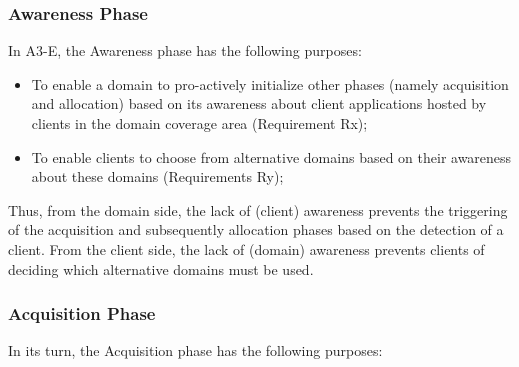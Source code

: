 \subsubsection{Awareness Phase}\label{sec:A3-E-awareness}


In A3-E, the Awareness phase has the following purposes:

\begin{itemize}
	
	\item To enable a domain to pro-actively initialize other phases (namely acquisition and allocation) based on its awareness about client applications hosted by clients in the domain coverage area (Requirement Rx);
	
	\item To enable clients to choose from alternative domains based on their awareness about these domains (Requirements Ry);
	
\end{itemize}

Thus, from the domain side, the lack of (client) awareness prevents the triggering of the acquisition and subsequently allocation phases based on the detection of a client. From the client side, the lack of (domain) awareness prevents clients of deciding which alternative domains must be used. 

\subsubsection{Acquisition Phase}\label{sec:A3-E-acquisition}

In its turn, the Acquisition phase has the following purposes:

